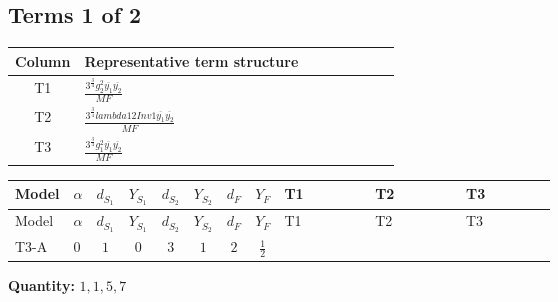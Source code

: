 \documentclass[8pt]{article}
\begin{document}
\begin{landscape}
\subsection*{Terms 1 of 2}
\begin{center}
\begin{tabular}{@{}c >{\raggedright\arraybackslash}p{0.82\linewidth}@{}}
\toprule
Column & Representative term structure \\
\midrule
T1 & \(\displaystyle \frac{3^{\frac{3}{4}} g_{2}^{2} \overline{y_{1}} \overline{y_{2}}}{MF}\) \\
\midrule
T2 & \(\displaystyle \frac{3^{\frac{3}{4}} lambda12Inv1 \overline{y_{1}} \overline{y_{2}}}{MF}\) \\
\midrule
T3 & \(\displaystyle \frac{3^{\frac{3}{4}} g_{1}^{2} \overline{y_{1}} \overline{y_{2}}}{MF}\) \\
\midrule
\bottomrule
\end{tabular}
\end{center}
\smallskip
\tiny
\begin{longtable}{@{}llcccccc >{\raggedright\arraybackslash}p{0.21\linewidth} >{\raggedright\arraybackslash}p{0.21\linewidth} >{\raggedright\arraybackslash}p{0.21\linewidth}@{}}
\toprule
Model & $\alpha$ & $d_{S_1}$ & $Y_{S_1}$ & $d_{S_2}$ & $Y_{S_2}$ & $d_F$ & $Y_F$ & T1 & T2 & T3 \\
\midrule
\endfirsthead
\toprule
Model & $\alpha$ & $d_{S_1}$ & $Y_{S_1}$ & $d_{S_2}$ & $Y_{S_2}$ & $d_F$ & $Y_F$ & T1 & T2 & T3 \\
\midrule
\endhead
T3-A & $0$ & $1$ & $0$ & $3$ & $1$ & $2$ & $\frac{1}{2}$ & \scriptsize\adjustbox{max width=\linewidth}{$\begin{gathered} - \frac{11 \cdot 3^{\frac{3}{4}} g_{2}^{2} \overline{y_{1}} \overline{y_{2}}}{8 MF}\end{gathered}$} & \scriptsize\adjustbox{max width=\linewidth}{$\begin{gathered} - \frac{3^{\frac{3}{4}} lambda12Inv1 \overline{y_{1}} \overline{y_{2}}}{6 MF}\end{gathered}$} & \scriptsize\adjustbox{max width=\linewidth}{$\begin{gathered} - \frac{3^{\frac{3}{4}} g_{1}^{2} \overline{y_{1}} \overline{y_{2}}}{8 MF}\end{gathered}$} \\
\midrule
\bottomrule
\end{longtable}
\clearpage
\noindent\textbf{Quantity: }$\mathrm{1,1,5,7}$\par\smallskip

\end{landscape}
\end{document}
